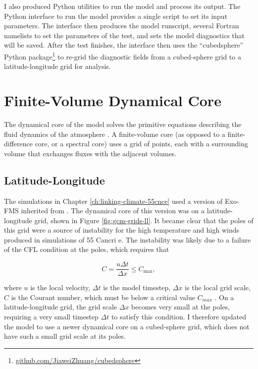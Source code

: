I also produced Python utilities to run the model and process its output. The Python interface to run the model provides a single script to set its input parameters. The interface then produces the model runscript, several Fortran namelists to set the parameters of the test, and sets the model diagnostics that will be saved. After the test finishes, the interface then uses the ``cubedsphere'' Python package\footnote{\url{github.com/JiaweiZhuang/cubedsphere}} to re-grid the diagnostic fields from a cubed-sphere grid to a latitude-longitude grid for analysis.


\section{Finite-Volume Dynamical Core}

The dynamical core of the model solves the primitive equations describing the fluid dynamics of the atmosphere \citep{lin2004fv, vallis2006book}. A finite-volume core (as opposed to a finite-difference core, or a spectral core) uses a grid of points, each with a surrounding volume that exchanges fluxes with the adjacent volumes.

\subsection{Latitude-Longitude}

The simulations in Chapter \ref{ch:linking-climate-55cnce} used a version of Exo-FMS inherited from \citet{pierrehumbert2016dynamics}. The dynamical core of this version was on a latitude-longitude grid, shown in Figure \ref{fig:gcm-grids-ll}. It became clear that the poles of this grid were a source of instability for the high temperature and high winds produced in simulations of 55 Cancri e. The instability was likely due to a failure of the CFL condition at the poles, which requires that

\begin{equation}
  C=\frac{u \Delta t}{\Delta x} \leq C_{\max },
\end{equation}

where $u$ is the local velocity, $\Delta t$ is the model timestep, $\Delta x$ is the local grid scale, $C$ is the Courant number, which must be below a critical value $C_{max}$ \citep{courant1928partiellen}. On a latitude-longitude grid, the grid scale $\Delta x$ becomes very small at the poles, requiring a very small timestep $\Delta t$ to satisfy this condition. I therefore updated the model to use a newer dynamical core on a cubed-sphere grid, which does not have such a small grid scale at its poles.


